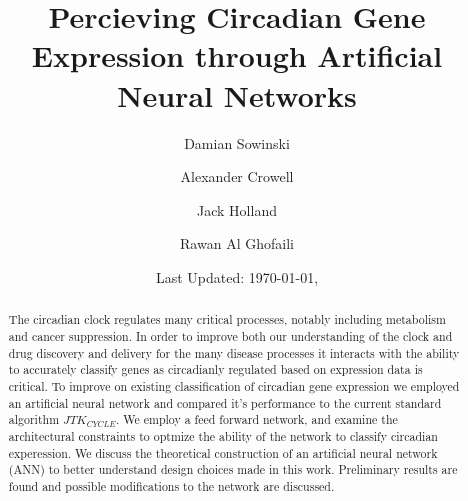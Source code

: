 \documentclass[prl,amsmath,amssymb,floatfix,superscriptaddress,notitlepage,twocolumn]{revtex4}
\begin{document}
\title{Percieving Circadian Gene Expression through Artificial Neural Networks}

\author{Damian Sowinski}

\author{Alexander Crowell}

\author{Jack Holland}

\author{Rawan Al Ghofaili}


\date{Last Updated: \today, \currenttime}

\begin{abstract}

The circadian clock regulates many critical processes, notably including metabolism and cancer suppression.  In order to improve both our understanding of the clock and drug discovery and delivery for the many disease processes it interacts with the ability to accurately classify genes as circadianly regulated based on expression data is critical.  To improve on existing classification of circadian gene expression we employed an artificial neural network and compared it's performance to the current standard algorithm $JTK_{CYCLE}$.  We employ a feed forward network, and examine the architectural constraints to optmize the ability of the network to classify circadian experession. We discuss the theoretical construction of an artificial neural network (ANN) to better understand design choices made in this work. Preliminary results are found and possible modifications to the network are discussed.

\end{abstract}

\maketitle
\end{document}
